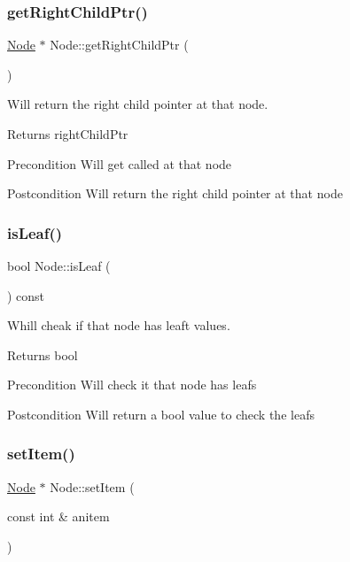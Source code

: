 \subsubsection{\texorpdfstring{get\+Right\+Child\+Ptr()}{getRightChildPtr()}}
{\footnotesize\ttfamily \mbox{\hyperlink{class_node}{Node}} $\ast$ Node\+::get\+Right\+Child\+Ptr (\begin{DoxyParamCaption}{ }\end{DoxyParamCaption})}



Will return the right child pointer at that node. 

\begin{DoxyReturn}{Returns}
right\+Child\+Ptr 
\end{DoxyReturn}
\begin{DoxyPrecond}{Precondition}
Will get called at that node 
\end{DoxyPrecond}
\begin{DoxyPostcond}{Postcondition}
Will return the right child pointer at that node 
\end{DoxyPostcond}
\mbox{\label{class_node_a0c5b662d3bfbb856292a9aab878ed622}} 
\subsubsection{\texorpdfstring{is\+Leaf()}{isLeaf()}}
{\footnotesize\ttfamily bool Node\+::is\+Leaf (\begin{DoxyParamCaption}{ }\end{DoxyParamCaption}) const}



Whill cheak if that node has leaft values. 

\begin{DoxyReturn}{Returns}
bool 
\end{DoxyReturn}
\begin{DoxyPrecond}{Precondition}
Will check it that node has leafs 
\end{DoxyPrecond}
\begin{DoxyPostcond}{Postcondition}
Will return a bool value to check the leafs 
\end{DoxyPostcond}
\mbox{\label{class_node_a2ee7aacc0b20abf2301256fe72d0d9cc}} 
\subsubsection{\texorpdfstring{set\+Item()}{setItem()}}
{\footnotesize\ttfamily \mbox{\hyperlink{class_node}{Node}} $\ast$ Node\+::set\+Item (\begin{DoxyParamCaption}\item[{const int \&}]{anitem }\end{DoxyParamCaption})}



